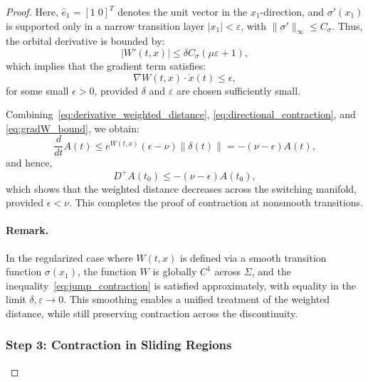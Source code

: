 \documentclass[11pt]{article}
\begin{document}
\begin{proof}
Here, \( \hat{e}_1 = [1 \; 0]^T \) denotes the unit vector in the \( x_1 \)-direction, and \( \sigma'(x_1) \) is supported only in a narrow transition layer \( |x_1| < \varepsilon \), with \( \|\sigma'\|_\infty \le C_\sigma \). Thus, the orbital derivative is bounded by:
\begin{equation} \label{eq:orbital_bound}
	|W'(t,x)| \le \delta C_\sigma (\mu \varepsilon + 1),
\end{equation}
which implies that the gradient term satisfies:
\begin{equation} \label{eq:gradW_bound}
	\nabla W(t,x) \cdot \dot{x}(t) \le \epsilon,
\end{equation}
for some small \( \epsilon > 0 \), provided \( \delta \) and \( \varepsilon \) are chosen sufficiently small.

Combining~\eqref{eq:derivative_weighted_distance}, \eqref{eq:directional_contraction}, and \eqref{eq:gradW_bound}, we obtain:
\begin{equation} \label{eq:contraction_final}
	\frac{d}{dt} A(t) \le e^{W(t,x)} (\epsilon - \nu) \|\delta(t)\| = - (\nu - \epsilon) A(t),
\end{equation}
and hence,
\begin{equation} \label{eq:Dini_contraction}
	D^+ A(t_0) \le - (\nu - \epsilon) A(t_0),
\end{equation}
which shows that the weighted distance decreases across the switching manifold, provided \( \epsilon < \nu \). This completes the proof of contraction at nonsmooth transitions.

\paragraph{Remark.} In the regularized case where \( W(t,x) \) is defined via a smooth transition function \( \sigma(x_1) \), the function \( W \) is globally \( C^1 \) across \( \Sigma \), and the inequality~\eqref{eq:jump_contraction} is satisfied approximately, with equality in the limit \( \delta, \varepsilon \to 0 \). This smoothing enables a unified treatment of the weighted distance, while still preserving contraction across the discontinuity.







\subsubsection*{Step 3: Contraction in Sliding Regions}


\end{proof}
\end{document}
